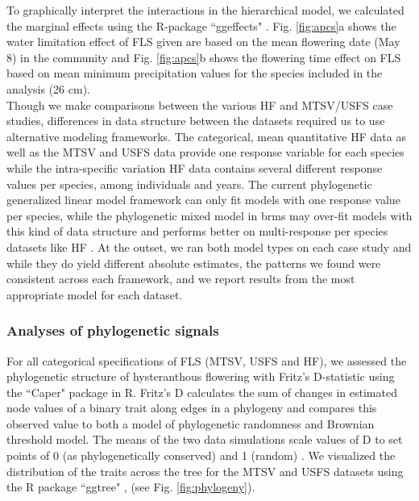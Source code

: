 \documentclass[11pt]{article}
\begin{document}
{%
\indent To graphically interpret the interactions in the hierarchical model, we calculated the marginal effects using the R-package ``ggeffects" \citep{Ludecke2018}. Fig. \ref{fig:apcs}a shows the water limitation effect of FLS given are based on the mean flowering date (May 8) in the community and  Fig. \ref{fig:apcs}b shows the flowering time effect on FLS based on mean minimum precipitation values for the species included in the analysis (26 cm). \\

\noindent Though we make comparisons between the various HF and MTSV/USFS case studies, differences in data structure between the datasets required us to use alternative modeling frameworks. The categorical, mean quantitative HF data as well as the MTSV and USFS data provide one response variable for each species while the intra-specific variation HF data contains several different response values per species, among individuals and years. The current phylogenetic generalized linear model framework can only fit models with one response value per species, while the phylogenetic mixed model in brms may over-fit models with this kind of data structure and performs better on multi-response per species datasets like HF \citep{BurknerPC}. At the outset, we ran both model types on each case study and while they do yield different absolute estimates, the patterns we found were consistent across each framework, and we report results from the most appropriate model for each dataset.\\

\subsubsection*{Analyses of phylogenetic signals}
\noindent For all categorical specifications of FLS (MTSV, USFS and HF), we assessed the phylogenetic structure of hysteranthous flowering with Fritz's D-statistic \citep{FRITZ2010} using the ``Caper" package \citep{Orme2013} in R. Fritz's D calculates the sum of changes in estimated node values of a binary trait along edges in a phylogeny and compares this observed value to both a model of phylogenetic randomness and Brownian threshold model. The means of the two data simulations scale values of D to set points of 0 (as phylogenetically conserved) and 1 (random)  \citep{Orme2013}. We visualized the distribution of the traits across the tree for the MTSV and USFS datasets using the R package ``ggtree" \citep{Yu2017}, (see Fig. \ref{fig:phylogeny}). \\

}
\end{document}
